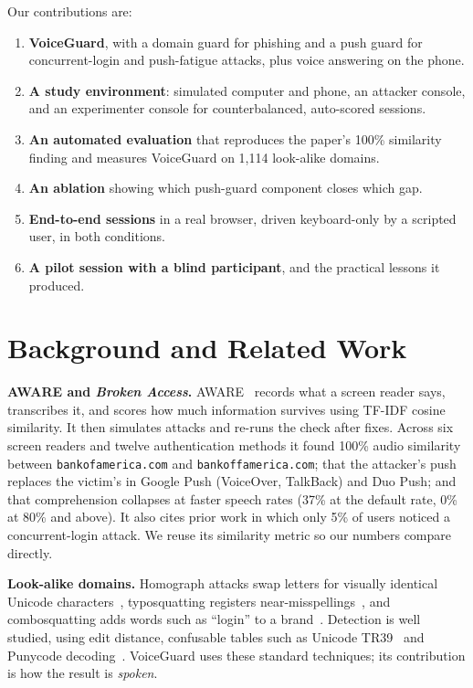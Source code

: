 \documentclass[conference]{IEEEtran}
\newcommand{\dom}[1]{\texttt{#1}}
\begin{document}
Our contributions are:
\begin{enumerate}
\item \textbf{VoiceGuard}, with a domain guard for phishing and a push guard for concurrent-login and push-fatigue attacks, plus voice answering on the phone.
\item \textbf{A study environment}: simulated computer and phone, an attacker console, and an experimenter console for counterbalanced, auto-scored sessions.
\item \textbf{An automated evaluation} that reproduces the paper's 100\% similarity finding and measures VoiceGuard on 1,114 look-alike domains.
\item \textbf{An ablation} showing which push-guard component closes which gap.
\item \textbf{End-to-end sessions} in a real browser, driven keyboard-only by a scripted user, in both conditions.
\item \textbf{A pilot session with a blind participant}, and the practical lessons it produced.
\end{enumerate}

\section{Background and Related Work}

\textbf{AWARE and \emph{Broken Access}.} AWARE~\cite{brokenaccess} records what a screen reader says, transcribes it, and scores how much information survives using TF-IDF cosine similarity. It then simulates attacks and re-runs the check after fixes. Across six screen readers and twelve authentication methods it found 100\% audio similarity between \dom{bankofamerica.com} and \dom{bankoffamerica.com}; that the attacker's push replaces the victim's in Google Push (VoiceOver, TalkBack) and Duo Push; and that comprehension collapses at faster speech rates (37\% at the default rate, 0\% at 80\% and above). It also cites prior work in which only 5\% of users noticed a concurrent-login attack. We reuse its similarity metric so our numbers compare directly.

\textbf{Look-alike domains.} Homograph attacks swap letters for visually identical Unicode characters~\cite{homograph}, typosquatting registers near-misspellings~\cite{typosquat}, and combosquatting adds words such as ``login'' to a brand~\cite{combosquat}. Detection is well studied, using edit distance, confusable tables such as Unicode TR39~\cite{tr39} and Punycode decoding~\cite{punycode}. VoiceGuard uses these standard techniques; its contribution is how the result is \emph{spoken}.
\end{document}
